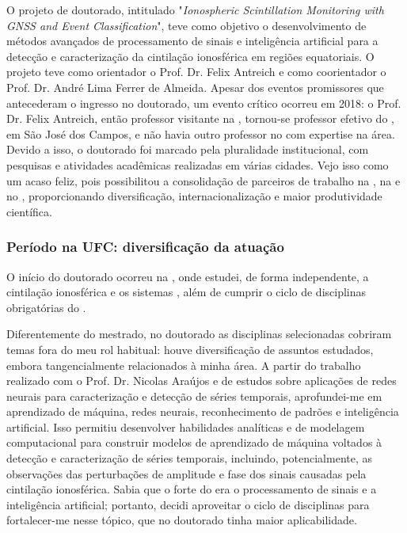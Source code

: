 \documentclass{article}
\begin{document}
O projeto de doutorado, intitulado "\emph{Ionospheric Scintillation Monitoring with GNSS and Event Classification}", teve como objetivo o desenvolvimento de métodos avançados de processamento de sinais e inteligência artificial para a detecção e caracterização da cintilação ionosférica em regiões equatoriais. O projeto teve como orientador o Prof. Dr. Felix Antreich e como coorientador o Prof. Dr. André Lima Ferrer de Almeida. Apesar dos eventos promissores que antecederam o ingresso no doutorado, um evento crítico ocorreu em 2018: o Prof. Dr. Felix Antreich, então professor visitante na , tornou-se professor efetivo do , em São José dos Campos, e não havia outro professor no  com expertise na área. Devido a isso, o doutorado foi marcado pela pluralidade institucional, com pesquisas e atividades acadêmicas realizadas em várias cidades. Vejo isso como um acaso feliz, pois possibilitou a consolidação de parceiros de trabalho na , na  e no , proporcionando diversificação, internacionalização e maior produtividade científica.

\subsubsection{Período na UFC: diversificação da atuação}

O início do doutorado ocorreu na , onde estudei, de forma independente, a cintilação ionosférica e os sistemas , além de cumprir o ciclo de disciplinas obrigatórias do .

Diferentemente do mestrado, no doutorado as disciplinas selecionadas cobriram temas fora do meu rol habitual: houve diversificação de assuntos estudados, embora tangencialmente relacionados à minha área. A partir do trabalho realizado com o Prof. Dr. Nicolas Araújos \cite{moreiraConvolutionalLongShortTermMemory2022} e de estudos sobre aplicações de redes neurais para caracterização e detecção de séries temporais, aprofundei-me em aprendizado de máquina, redes neurais, reconhecimento de padrões e inteligência artificial. Isso permitiu desenvolver habilidades analíticas e de modelagem computacional para construir modelos de aprendizado de máquina voltados à detecção e caracterização de séries temporais, incluindo, potencialmente, as observações das perturbações de amplitude e fase dos sinais  causadas pela cintilação ionosférica. Sabia que o forte do  era o processamento de sinais e a inteligência artificial; portanto, decidi aproveitar o ciclo de disciplinas para fortalecer-me nesse tópico, que no doutorado tinha maior aplicabilidade.
\end{document}
